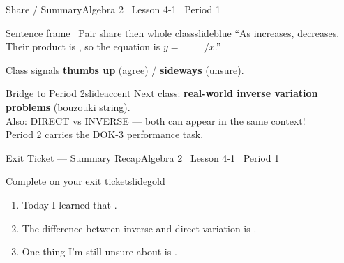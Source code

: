 \documentclass[aspectratio=169, 14pt]{beamer}
\begin{document}
\begin{frame}{Share / Summary}{Algebra 2 \textperiodcentered\ Lesson 4-1 \textperiodcentered\ Period 1}
\vspace{0.2cm}
\begin{projcard}{Sentence frame \textperiodcentered\ Pair share then whole class}{slideblue}
``As \underline{\hspace{1.2cm}} increases, \underline{\hspace{1.2cm}} decreases.
Their product is \underline{\hspace{1.2cm}}, so the equation is
\(y = \underline{\hspace{1cm}}/x\).''

\vspace{0.2cm}
Class signals \textbf{thumbs up} (agree) / \textbf{sideways} (unsure).
\end{projcard}

\vspace{0.15cm}
\begin{projcard}{Bridge to Period 2}{slideaccent}
Next class: \textbf{real-world inverse variation problems} (bouzouki string).\\
Also: DIRECT vs INVERSE --- both can appear in the same context!\\
Period 2 carries the DOK-3 performance task.
\end{projcard}
\end{frame}

\begin{frame}{Exit Ticket --- Summary Recap}{Algebra 2 \textperiodcentered\ Lesson 4-1 \textperiodcentered\ Period 1}
\vspace{0.2cm}
\begin{projcard}{Complete on your exit ticket}{slidegold}
\begin{enumerate}
  \setlength{\itemsep}{0.2cm}
  \item Today I learned that \underline{\hspace{5cm}}.
  \item The difference between inverse and direct variation is \underline{\hspace{4cm}}.
  \item One thing I'm still unsure about is \underline{\hspace{5cm}}.
\end{enumerate}
\end{projcard}
\end{frame}
\end{document}
